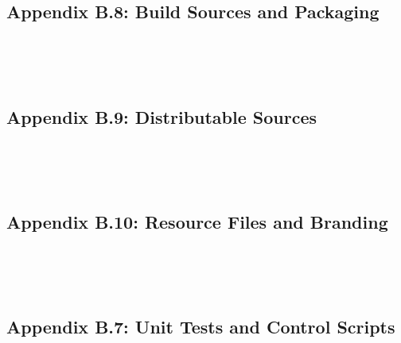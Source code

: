 \documentclass{article}[11pt]
\begin{document}
\subsection{Appendix B.8: Build Sources and Packaging}
\inputminted[frame=single,label=pom.xml (NAOMI Project)]{xml}{../naomi/pom.xml}
\inputminted[frame=single,label=pom.xml (NAOMI Bundle)]{xml}{../naomi/pom.xml}
\inputminted[frame=single,label=MANIFEST.MF]{bash}{../naomi/src/main/resources/META-INF/MANIFEST.MF}
\inputminted[frame=single,label=org.radigan.naomi.service.Module]{bash}{../naomi/src/main/resources/META-INF/services/org.radigan.naomi.service.Module}
\inputminted[frame=single,label=org.radigan.system.tools.AbstractTool]{bash}{../naomi/src/main/resources/META-INF/services/org.radigan.system.tools.AbstractTool}
\subsection{Appendix B.9: Distributable Sources}
\inputminted[frame=single,label=naomi.vbs]{bash}{../dist/bin/naomi.vbs}
\inputminted[frame=single,label=application.xml]{python}{../dist/deploy/application.naomi}
\inputminted[frame=single,label=naomi-features.xml]{xml}{../dist/deploy/naomi-features.xml}
\inputminted[frame=single,label=naomi.conf]{python}{../dist/config/naomi.conf}
\inputminted[frame=single,label=naomi.cfg]{bash}{../dist/deploy/naomi.cfg}
\subsection{Appendix B.10: Resource Files and Branding}
\inputminted[frame=single,label=org.radigan.system.tools.Tool]{bash}{../naomi/src/main/resources/META-INF/services/org.radigan.system.tools.Tool}
\inputminted[frame=single,label=branding.properties]{bash}{../naomi/src/main/resources/org/apache/karaf/branding/branding.properties}
\inputminted[frame=single,label=nyancat.ascii]{bash}{../naomi/src/main/resources/org/radigan/naomi/data/ascii/nyancat.ascii}
\inputminted[frame=single,label=wumpus.ascii]{bash}{../naomi/src/main/resources/org/radigan/naomi/data/ascii/wumpus.ascii}
\inputminted[frame=single,label=wumpus-face.ascii]{bash}{../naomi/src/main/resources/org/radigan/naomi/data/ascii/wumpus-face.ascii}
\subsection{Appendix B.7: Unit Tests and Control Scripts}
\inputminted[frame=single,label=config.ncs]{python}{../scripts/conig.ncs}
\inputminted[frame=single,label=matrix.ncs]{python}{../scripts/matrix.ncs}
\inputminted[frame=single,label=module.ncs]{python}{../scripts/module.ncs}
\inputminted[frame=single,label=naomi.ncs]{python}{../scripts/naomi.ncs}
\inputminted[frame=single,label=nyancat.ncs]{python}{../scripts/nyancat.ncs}
\inputminted[frame=single,label=request.ncs]{python}{../scripts/request.ncs}
\inputminted[frame=single,label=roar.ncs]{python}{../scripts/roar.ncs}
\inputminted[frame=single,label=types.ncs]{python}{../scripts/types.ncs}
\inputminted[frame=single,label=wumpus.ncs]{python}{../scripts/wumpus.ncs}
\inputminted[frame=single,label=wumpusutil.ncs]{python}{../scripts/wumpusutil.ncs}
\end{document}
